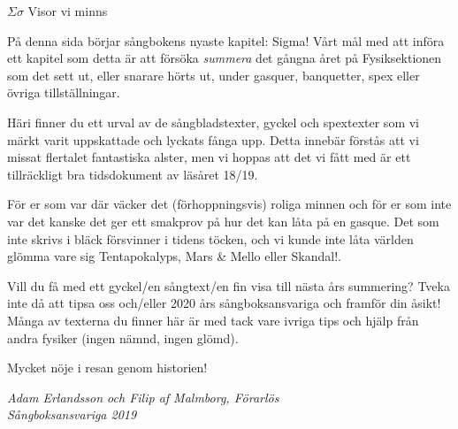 \documentclass[a6paper,10pt]{article}
\begin{document}
\noindent
\huge{$\Sigma\sigma$ Visor vi minns}
\vspace{10pt}

\noindent
\small
På denna sida börjar sångbokens nyaste kapitel: Sigma! Vårt mål med att införa ett kapitel som detta är att försöka \textit{summera} det gångna året på Fysiksektionen som det sett ut, eller snarare hörts ut, under gasquer, banquetter, spex eller övriga tillställningar. 

Häri finner du ett urval av de sångbladstexter, gyckel och spextexter som vi märkt varit uppskattade och lyckats fånga upp. Detta innebär förstås att vi missat flertalet fantastiska alster, men vi hoppas att det vi fått med är ett tillräckligt bra tidsdokument av läsåret 18/19. 

För er som var där väcker det (förhoppningsvis) roliga minnen och för er som inte var det kanske det ger ett smakprov på hur det kan låta på en gasque. Det som inte skrivs i bläck försvinner i tidens töcken, och vi kunde inte låta världen glömma vare sig Tentapokalyps, Mars \& Mello eller Skandal!. 

Vill du få med ett gyckel/en sångtext/en fin visa till nästa års summering? Tveka inte då att tipsa oss och/eller 2020 års sångboksansvariga och framför din åsikt! Många av texterna du finner här är med tack vare ivriga tips och hjälp från andra fysiker (ingen nämnd, ingen glömd). 

Mycket nöje i resan genom historien! 
\begin{flushright}
\textit{Adam Erlandsson och Filip af Malmborg, Förarlös \\Sångboksansvariga 2019}
\end{flushright}
\setlength{\oddsidemargin}{-0.47in}
\end{document}
